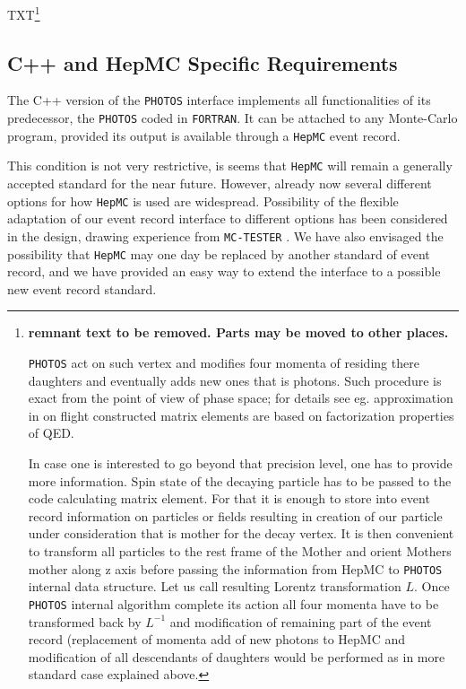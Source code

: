 \documentclass[]{Photos_interface_design}
\begin{document}
TXT\footnote{ {\bf remnant text to be removed. Parts may be moved to other places.}  

{\tt PHOTOS} act on such vertex and modifies four momenta of residing there daughters 
and eventually adds new ones that is photons. 
Such procedure is exact from the point of view of phase space; for details see eg.  approximation in on flight constructed matrix elements are based
on factorization properties of QED. 

In case one is interested to go beyond that precision level, one has to  provide
more information. Spin state of the decaying particle has to be passed to the code calculating matrix element. For that it is enough to store into event record
information on particles or fields resulting in creation of
our particle under consideration that is mother for the decay vertex.
It is then convenient to transform all particles to the rest frame of the Mother
and orient Mothers mother along z axis before passing the information from HepMC to {\tt PHOTOS} internal data structure. Let us call resulting Lorentz transformation $L$. Once {\tt PHOTOS} internal algorithm complete
its action all four momenta have to be transformed back by $L^{-1}$ and 
modification of remaining part of the event record (replacement of momenta
add of new photons to HepMC and modification of all descendants of 
daughters would be performed as in more standard case explained above.
}

\subsection{C++ and HepMC Specific Requirements}

The C++ version of the {\tt PHOTOS} interface implements all functionalities
of its predecessor, the {\tt PHOTOS} coded in {\tt FORTRAN}.
It can be attached to any Monte-Carlo program,
provided its output is available through a {\tt HepMC} \cite{Dobbs:2001ck} event record.

This condition is not very restrictive, is seems that {\tt HepMC} will
remain a generally accepted standard for the near future. However,
already now several different options for how {\tt HepMC} is used are
widespread. Possibility of the flexible  adaptation of our event record 
interface to different
options has been considered in the design,  drawing experience
from {\tt MC-TESTER} \cite{Golonka:2002rz,Davidson:2008ma}.
We have also
envisaged the possibility that {\tt HepMC} may one day be replaced by another
standard of event record, and we have provided an easy way to extend
the interface to a possible new event record standard.
\end{document}

